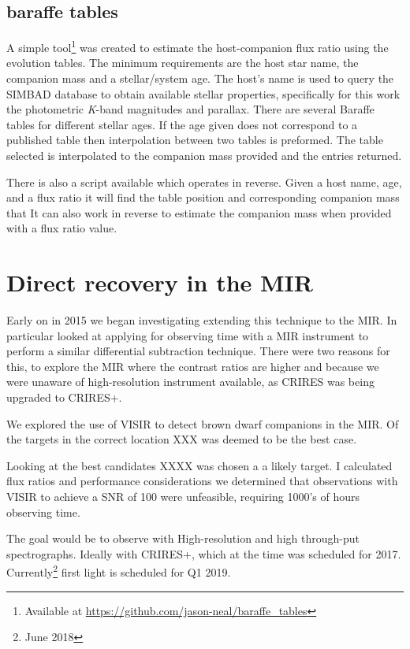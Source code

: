 \subsection{baraffe tables}
A simple tool\footnote{Available at \url{https://github.com/jason-neal/baraffe_tables}} was created to estimate the host-companion flux ratio using the~\citep{baraffe_evolutionary_2003,baraffe_new_2015} evolution tables. The minimum requirements are the host star name, the companion mass and a stellar/system age. The host's name is used to query the SIMBAD database to obtain available stellar properties, specifically for this work the photometric \textit{K}-band magnitudes and parallax. There are several Baraffe tables for different stellar ages. If the age given does not correspond to a published table then interpolation between two tables is preformed. The table selected is interpolated to the companion mass provided and the entries returned.

There is also a script available which operates in reverse. Given a host name, age, and a flux ratio it will find the table position and corresponding companion mass that It can also work in reverse to estimate the companion mass when provided with a flux ratio value.





\section{Direct recovery in the MIR}
Early on in 2015 we began investigating extending this technique to the MIR. In particular looked at applying for observing time with a MIR instrument to perform a similar differential subtraction technique.
There were two reasons for this, to explore the MIR where the contrast ratios are higher and because we were unaware of high-resolution \nir{} instrument available, as CRIRES was being upgraded to CRIRES+.

We explored the use of VISIR to detect brown dwarf companions in the MIR. Of the targets in the correct location XXX was deemed to be the best case.

Looking at the best candidates XXXX was chosen a a likely target. I calculated flux ratios and performance considerations we determined that observations with VISIR to achieve a SNR of 100 were unfeasible, requiring 1000's of hours observing time.

The goal would be to observe with High-resolution and high through-put spectrographs. Ideally with CRIRES+, which at the time was scheduled for 2017. Currently\footnote{June 2018} first light is scheduled for Q1 2019.
